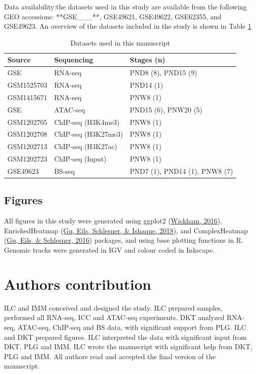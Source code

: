 \documentclass[12pt,twoside]{reedthesis}
\begin{document}
Data availability:the datasets used in this study are available from the
following GEO accessions: **GSE\_\_\_**, GSE49621, GSE49622,
GSE62355, and GSE49623. An overview of the datasets included in the
study is shown in Table \ref{tab:devtab1}
\begin{longtable}[t]{lll}
\caption[Datasets used in this manuscript]{\label{tab:devtab1}Datasets used in this manuscript}\\
\toprule
Source & Sequencing & Stages (n)\\
\midrule
GSE & RNA-seq & PND8 (8), PND15 (9)\\
GSM1525703 & RNA-seq & PND14 (1)\\
GSM1415671 & RNA-seq & PNW8 (1)\\
GSE & ATAC-seq & PND15 (6), PNW20 (5)\\
GSM1202705 & ChIP-seq (H3K4me3) & PNW8 (1)\\
\addlinespace
GSM1202708 & ChIP-seq (H3K27me3) & PNW8 (1)\\
GSM1202713 & ChIP-seq (H3K27ac) & PNW8 (1)\\
GSM1202723 & ChIP-seq (Input) & PNW8 (1)\\
GSE49623 & BS-seq & PND7 (1), PND14 (1), PNW8 (7)\\
\bottomrule
\end{longtable}
\hypertarget{figures}{%
\subsection{Figures}\label{figures}}

All figures in this study were generated using ggplot2 (\protect\hyperlink{ref-wickham2016}{Wickham, 2016}),
EnrichedHeatmap (\protect\hyperlink{ref-gu2018}{Gu, Eils, Schlesner, \& Ishaque, 2018}), and ComplexHeatmap (\protect\hyperlink{ref-gu2016}{Gu, Eils, \& Schlesner, 2016}) packages, and
using base plotting functions in R. Genomic tracks were generated in IGV
and colour coded in Inkscape.

\hypertarget{authors-contribution}{%
\section{Authors contribution}\label{authors-contribution}}

ILC and IMM conceived and designed the study. ILC prepared samples,
performed all RNA-seq, ICC and ATAC-seq experiments. DKT analyzed
RNA-seq, ATAC-seq, ChIP-seq and BS data, with significant support from
PLG. ILC and DKT prepared figures. ILC interpreted the data with
significant input from DKT, PLG and IMM. ILC wrote the manuscript with
significant help from DKT, PLG and IMM. All authors read and accepted
the final version of the manuscript.
\end{document}
